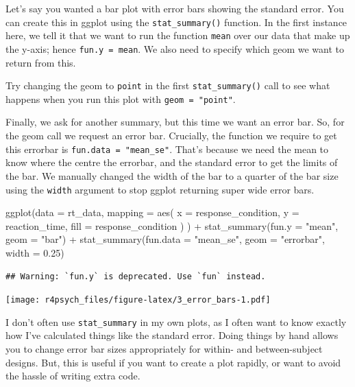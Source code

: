 \documentclass[
]{book}
\newenvironment{Shaded}{\begin{snugshade}}{\end{snugshade}}
\newcommand{\AttributeTok}[1]{\textcolor[rgb]{0.77,0.63,0.00}{#1}}
\newcommand{\FloatTok}[1]{\textcolor[rgb]{0.00,0.00,0.81}{#1}}
\newcommand{\FunctionTok}[1]{\textcolor[rgb]{0.00,0.00,0.00}{#1}}
\newcommand{\NormalTok}[1]{#1}
\newcommand{\SpecialCharTok}[1]{\textcolor[rgb]{0.00,0.00,0.00}{#1}}
\newcommand{\StringTok}[1]{\textcolor[rgb]{0.31,0.60,0.02}{#1}}
\begin{document}
Let's say you wanted a bar plot with error bars showing the standard error. You can create this in ggplot using the \texttt{stat\_summary()} function. In the first instance here, we tell it that we want to run the function \texttt{mean} over our data that make up the y-axis; hence \texttt{fun.y\ =\ mean}. We also need to specify which geom we want to return from this.

Try changing the geom to \texttt{point} in the first \texttt{stat\_summary()} call to see what happens when you run this plot with \texttt{geom\ =\ "point"}.

Finally, we ask for another summary, but this time we want an error bar. So, for the geom call we request an error bar. Crucially, the function we require to get this errorbar is \texttt{fun.data\ =\ "mean\_se"}. That's because we need the mean to know where the centre the errorbar, and the standard error to get the limits of the bar. We manually changed the width of the bar to a quarter of the bar size using the \texttt{width} argument to stop ggplot returning super wide error bars.

\begin{Shaded}
\begin{Highlighting}[]
\FunctionTok{ggplot}\NormalTok{(}\AttributeTok{data =}\NormalTok{ rt\_data, }
       \AttributeTok{mapping =} \FunctionTok{aes}\NormalTok{(}
         \AttributeTok{x =}\NormalTok{ response\_condition,}
         \AttributeTok{y =}\NormalTok{ reaction\_time, }
         \AttributeTok{fill =}\NormalTok{ response\_condition}
\NormalTok{         )}
\NormalTok{       ) }\SpecialCharTok{+} 
  \FunctionTok{stat\_summary}\NormalTok{(}\AttributeTok{fun.y =} \StringTok{"mean"}\NormalTok{, }\AttributeTok{geom =} \StringTok{"bar"}\NormalTok{) }\SpecialCharTok{+}
  \FunctionTok{stat\_summary}\NormalTok{(}\AttributeTok{fun.data =} \StringTok{"mean\_se"}\NormalTok{, }\AttributeTok{geom =} \StringTok{"errorbar"}\NormalTok{, }\AttributeTok{width =} \FloatTok{0.25}\NormalTok{)}
\end{Highlighting}
\end{Shaded}

\begin{verbatim}
## Warning: `fun.y` is deprecated. Use `fun` instead.
\end{verbatim}

\texttt{[image: r4psych\_files/figure-latex/3\_error\_bars-1.pdf]}

I don't often use \texttt{stat\_summary} in my own plots, as I often want to know exactly how I've calculated things like the standard error. Doing things by hand allows you to change error bar sizes appropriately for within- and between-subject designs. But, this is useful if you want to create a plot rapidly, or want to avoid the hassle of writing extra code.
\end{document}
